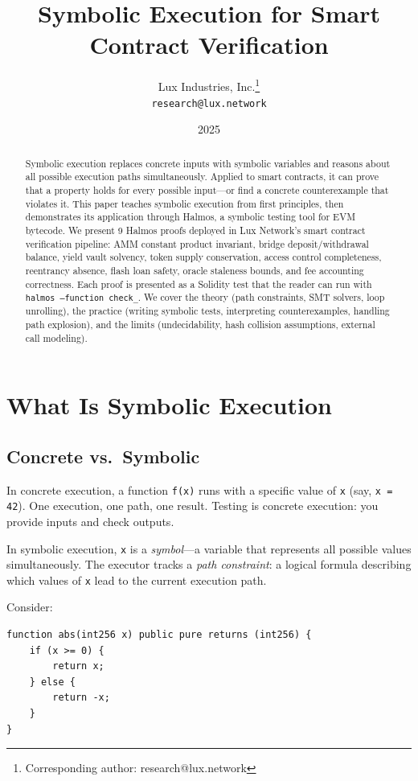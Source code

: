 \documentclass[11pt,a4paper]{article}
\title{Symbolic Execution for Smart Contract Verification}
\author{
Lux Industries, Inc.\thanks{Corresponding author: research@lux.network}\\
\texttt{research@lux.network}
}
\date{2025}
\begin{document}
\luxcoverpage

\begin{abstract}
Symbolic execution replaces concrete inputs with symbolic variables and reasons about all
possible execution paths simultaneously. Applied to smart contracts, it can prove that a
property holds for every possible input---or find a concrete counterexample that violates
it. This paper teaches symbolic execution from first principles, then demonstrates its
application through Halmos, a symbolic testing tool for EVM bytecode. We present 9
Halmos proofs deployed in Lux Network's smart contract verification pipeline: AMM constant
product invariant, bridge deposit/withdrawal balance, yield vault solvency, token supply
conservation, access control completeness, reentrancy absence, flash loan safety, oracle
staleness bounds, and fee accounting correctness. Each proof is presented as a Solidity
test that the reader can run with \texttt{halmos --function check\_}. We cover the
theory (path constraints, SMT solvers, loop unrolling), the practice (writing symbolic
tests, interpreting counterexamples, handling path explosion), and the limits (undecidability,
hash collision assumptions, external call modeling).
\end{abstract}

\tableofcontents
\newpage

\section{What Is Symbolic Execution}

\subsection{Concrete vs.\ Symbolic}

In concrete execution, a function \texttt{f(x)} runs with a specific value of \texttt{x}
(say, \texttt{x = 42}). One execution, one path, one result. Testing is concrete
execution: you provide inputs and check outputs.

In symbolic execution, \texttt{x} is a \emph{symbol}---a variable that represents all
possible values simultaneously. The executor tracks a \emph{path constraint}: a logical
formula describing which values of \texttt{x} lead to the current execution path.

Consider:

\begin{lstlisting}[language=Solidity,caption={A simple function with two paths}]
function abs(int256 x) public pure returns (int256) {
    if (x >= 0) {
        return x;
    } else {
        return -x;
    }
}
\end{lstlisting}
\end{document}
